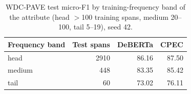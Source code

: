 \begin{table}[t]\centering\small
\begin{tabular}{lrrr}\toprule
Frequency band & Test spans & DeBERTa & CPEC \\\midrule
head & 2910 & 86.16 & 87.50 \\
medium & 448 & 83.35 & 85.42 \\
tail & 60 & 73.02 & 76.11 \\
\bottomrule\end{tabular}
\caption{WDC-PAVE test micro-F1 by training-frequency band of the attribute (head $>$100 training spans, medium 20--100, tail 5--19), seed 42.}\label{tab:bands}\end{table}
